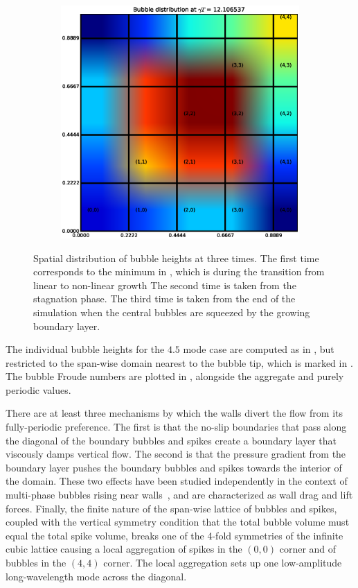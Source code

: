\begin{figure}
\begin{subfigure}[b]{0.32\textwidth}
\end{subfigure}
\begin{subfigure}[b]{0.32\textwidth}
  \includegraphics[width=\textwidth]{figs/spatial_bubble-59}
\end{subfigure}
\caption{ 
Spatial distribution of bubble heights at three times.
The first time corresponds to the minimum in , which is during the transition from linear to non-linear growth
The second time is taken from the stagnation phase.
The third time is taken from the end of the simulation when the central bubbles are squeezed by the growing boundary layer.
}
\end{figure}

The individual bubble heights for the $4.5$ mode case are computed as in , but restricted to the span-wise domain nearest to the bubble tip, which is marked in .
The bubble Froude numbers are plotted in , alongside the aggregate and purely periodic values.

There are at least three mechanisms by which the walls divert the flow from its fully-periodic preference.
The first is that the no-slip boundaries that pass along the diagonal of the boundary bubbles and spikes create a boundary layer that viscously damps vertical flow.
The second is that the pressure gradient from the boundary layer pushes the boundary bubbles and spikes towards the interior of the domain.
These two effects have been studied independently in the context of multi-phase bubbles rising near walls~\cite{Takemura2002}, and are characterized as wall drag and lift forces.
Finally, the finite nature of the span-wise lattice of bubbles and spikes, coupled with the vertical symmetry condition that the total bubble volume must equal the total spike volume, breaks one of the 4-fold symmetries of the infinite cubic lattice causing a local aggregation of spikes in the $(0,0)$ corner and of bubbles in the $(4,4)$ corner.
The local aggregation sets up one low-amplitude long-wavelength mode across the diagonal.

